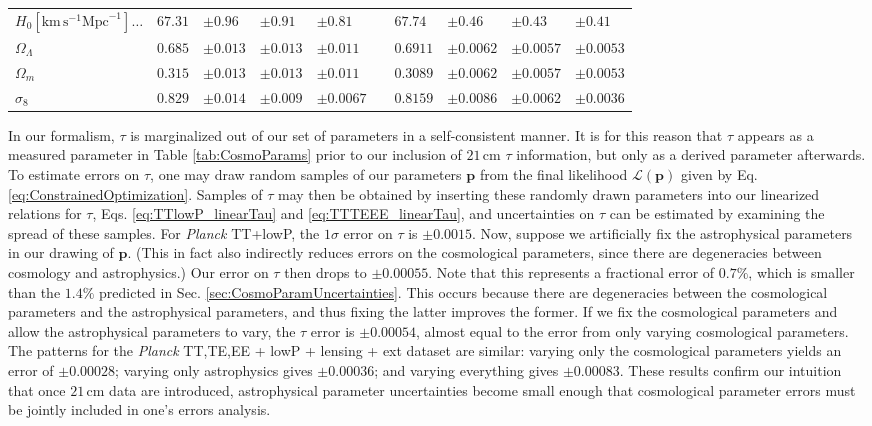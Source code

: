 \documentclass[twocolumn,aps,prd,nofootinbib,showpacs,superscriptaddress]{revtex4-1}
\begin{document}
\begin{table}
\begin{ruledtabular}
\begin{tabular}{lllllcllll}
$H_0 \left[ \textrm{km}\,\textrm{s}^{-1}\textrm{Mpc}^{-1}\right] \dots$ \dotfill & $67.31 $&$\pm 0.96$ & $\pm0.91$ &  $\pm 0.81$ && $67.74 $&$\pm 0.46$ & $\pm 0.43$ &  $\pm 0.41$ \\
$\Omega_\Lambda$ \dotfill & $0.685 $&$\pm 0.013$ &  $ \pm 0.013$ &  $\pm 0.011$ && $0.6911$& $ \pm 0.0062$ & $\pm 0.0057$ &  $\pm 0.0053$ \\
$\Omega_m$ \dotfill & $0.315$& $ \pm 0.013$ &   $ \pm 0.013$ & $\pm 0.011$&& $0.3089 $&$\pm 0.0062$ & $\pm 0.0057$ &  $\pm 0.0053$  \\
$\sigma_8$ \dotfill & $0.829$&$ \pm 0.014$ & $\pm 0.009$ & $\mathbf{\pm 0.0067}$ && $0.8159$& $ \pm 0.0086$ & $\pm 0.0062$ &  $\mathbf{\pm 0.0036}$\\
\end{tabular}
\end{ruledtabular}
\end{table}

In our formalism, $\tau$ is marginalized out of our set of parameters in a self-consistent manner. It is for this reason that $\tau$ appears as a measured parameter in Table \ref{tab:CosmoParams} prior to our inclusion of $21\,\textrm{cm}$ $\tau$ information, but only as a derived parameter afterwards. To estimate errors on $\tau$, one may draw random samples of our parameters $\mathbf{p}$ from the final likelihood $\mathcal L (\mathbf{p})$ given by Eq. \eqref{eq:ConstrainedOptimization}. Samples of $\tau$ may then be obtained by inserting these randomly drawn parameters into our linearized relations for $\tau$, Eqs. \eqref{eq:TTlowP_linearTau} and \eqref{eq:TTTEEE_linearTau}, and uncertainties on $\tau$ can be estimated by examining the spread of these samples. For \emph{Planck} TT+lowP, the $1\sigma$ error on $\tau$ is $\pm 0.0015$. Now, suppose we artificially fix the astrophysical parameters in our drawing of $\mathbf{p}$. (This in fact also indirectly reduces errors on the cosmological parameters, since there are degeneracies between cosmology and astrophysics.) Our error on $\tau$ then drops to $\pm 0.00055$. Note that this represents a fractional error of $0.7\%$, which is smaller than the $1.4\%$ predicted in Sec. \ref{sec:CosmoParamUncertainties}. This occurs because there are degeneracies between the cosmological parameters and the astrophysical parameters, and thus fixing the latter improves the former. If we fix the cosmological parameters and allow the astrophysical parameters to vary, the $\tau$ error is $\pm 0.00054$, almost equal to the error from only varying cosmological parameters. The patterns for the \emph{Planck} TT,TE,EE + lowP + lensing + ext dataset are similar: varying only the cosmological parameters yields an error of $\pm 0.00028$; varying only astrophysics gives $\pm 0.00036$; and varying everything gives $\pm 0.00083$. These results confirm our intuition that once $21\,\textrm{cm}$ data are introduced, astrophysical parameter uncertainties become small enough that cosmological parameter errors must be jointly included in one's errors analysis.
\end{document}
